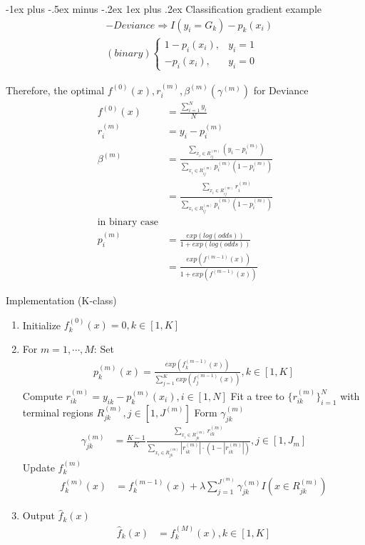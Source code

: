 \documentclass[a4paper,12pt,landscape]{article}
\makeatletter
\renewcommand{\subsubsection}{\@startsection{subsubsection}{3}{0mm}%
                                {-1ex plus -.5ex minus -.2ex}%
                                {1ex plus .2ex}%
                                {\normalfont\small\bfseries\color{violet}}}
\makeatother
\begin{document}
\begin{multicols}{3}
\subsubsection{Classification gradient example}
\begin{align*}
    &-Deviance \Rightarrow I(y_i = G_k) - p_k(x_i)\\
    &(binary) \begin{cases}
        1 - p_i(x_i), & y_i = 1\\
        - p_i(x_i), & y_i = 0
    \end{cases}
\end{align*}

Therefore, the optimal $f^{(0)}(x), r_{i}^{(m)}, \beta^{(m)} (\gamma^{(m)})$ for Deviance
\begin{align*}
    f^{(0)}(x) &= \frac{\sum_{i=1}^N y_i}{N}\\
    r_{i}^{(m)} &= y_i - p_i^{(m)}\\
    \beta^{(m)} &= \frac{\sum_{x_i\in R_{ij}^{(m)}} (y_i-p^{(m)}_i)}{\sum_{x_i\in R_{ij}^{(m)}}
    p^{(m)}_i(1-p^{(m)}_i)}\\
                &= \frac{\sum_{x_i\in R_{ij}^{(m)}}r_{i}^{(m)}}{\sum_{x_i\in R_{ij}^{(m)}} p^{(m)}_i(1-p^{(m)}_i)}\\
    \text{in binary case}&\\
    p_i^{(m)} &= \frac{exp(log(odds))}{1+exp(log(odds))}\\
              &=  \frac{exp(f^{(m-1)}(x))}{1+exp(f^{(m-1)}(x))}
\end{align*}

Implementation (K-class)
\begin{enumerate}
    \item Initialize $f_{k}^{(0)}(x) = 0, k\in[1, K]$
    \item For $m = 1, \cdots, M$:
        \subitem[a] Set \begin{align*}p_k^{(m)}(x) = \frac{exp(f_{k}^{(m-1)}(x))}{\sum_{j=1}^K exp(f_{j}^{(m-1)}(x))}, k\in[1,
        K]\end{align*}
        \subitem[b] Compute $r_{ik}^{(m)}=y_{ik}-p^{(m)}_k(x_i), i\in[1, N]$
        \subitem[c] Fit a tree to $\{r_{ik}^{(m)}\}_{i=1}^N$ with terminal regions $R^{(m)}_{jk}, j\in[1, J^{(m)}]$
        \subitem[d] Form $\gamma_{jk}^{(m)}$ \begin{align*}
            \gamma_{jk}^{(m)} &= \frac{K-1}{K} \frac{\sum_{x_i\in R_{jk}^{(m)}} r_{ik}^{(m)}}{\sum_{x_i \in
            R_{jk}^{(m)}} |r_{ik}^{(m)}|\cdot (1 - | r_{ik}^{(m)} | )}, j\in[1, J_m]
        \end{align*}
        \subitem[e] Update $f_{k}^{(m)}$ \begin{align*}
            f_{k}^{(m)}(x) &= f_{k}^{(m-1)}(x) + \lambda \sum_{j=1}^{J^{(m)}} \gamma_{jk}^{(m)} I(x\in R_{jk}^{(m)})
        \end{align*}
    \item Output $\hat f_k(x)$ \begin{align*}
        \hat{f}_k(x) &= f_k^{(M)}(x), k\in[1, K]
        \end{align*}
\end{enumerate}


\end{multicols}
\end{document}
